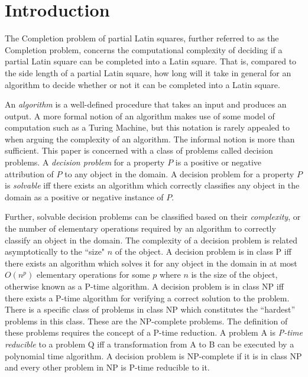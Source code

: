 \documentclass[12pt]{article}
\theoremstyle{definition}
\theoremstyle{remark}
\begin{document}
\maketitle

\section{Introduction}

The Completion problem of partial Latin squares, further referred to as the Completion problem, concerns the computational complexity of deciding if a partial Latin square can be completed into a Latin square. That is, compared to the side length of a partial Latin square, how long will it take in general for an algorithm to decide whether or not it can be completed into a Latin square.

An \textit{algorithm} is a well-defined procedure that takes an input and produces an output\cite{cormenetal}. A more formal notion of an algorithm makes use of some model of computation such as a Turing Machine, but this notation is rarely appealed to when arguing the complexity of an algorithm. The informal notion is more than sufficient. This paper is concerned with a class of problems called decision problems. A \textit{decision problem} for a property $P$ is a positive or negative attribution of $P$ to any object in the domain. A decision problem for a property $P$ is \textit{solvable} iff there exists an algorithm which correctly classifies any object in the domain as a positive or negative instance of $P$\cite{boolosjeffrey}.

Further, solvable decision problems can be classified based on their \textit{complexity}, or the number of elementary operations required by an algorithm to correctly classify an object in the domain. The complexity of a decision problem is related asymptotically to the ``size" $n$ of the object. A decision problem is in class P iff there exists an algorithm which solves it for any object in the domain in at most $O(n^p)$ elementary operations for some $p$ where $n$ is the size of the object, otherwise known as a P-time algorithm. A decision problem is in class NP iff there exists a P-time algorithm for verifying a correct solution to the problem. There is a specific class of problems in class NP which constitutes the ``hardest'' problems in this class. These are the NP-complete problems. The definition of these problems requires the concept of a P-time reduction. A problem A is \textit{P-time reducible} to a problem Q iff a transformation from A to B can be executed by a polynomial time algorithm. A decision problem is NP-complete if it is in class NP and every other problem in NP is P-time reducible to it. 
\end{document}
